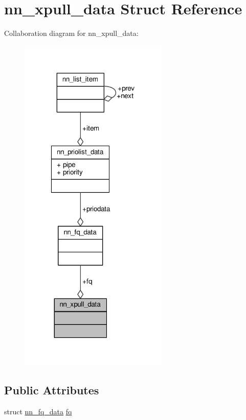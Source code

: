 \hypertarget{structnn__xpull__data}{}\section{nn\+\_\+xpull\+\_\+data Struct Reference}
\label{structnn__xpull__data}


Collaboration diagram for nn\+\_\+xpull\+\_\+data\+:\nopagebreak
\begin{figure}[H]
\begin{center}
\leavevmode
\includegraphics[width=202pt]{structnn__xpull__data__coll__graph}
\end{center}
\end{figure}
\subsection*{Public Attributes}
\begin{DoxyCompactItemize}
\item 
struct \hyperlink{structnn__fq__data}{nn\+\_\+fq\+\_\+data} \hyperlink{structnn__xpull__data_ab7f05878a08a8ee56cd825ffc583d295}{fq}
\end{DoxyCompactItemize}



